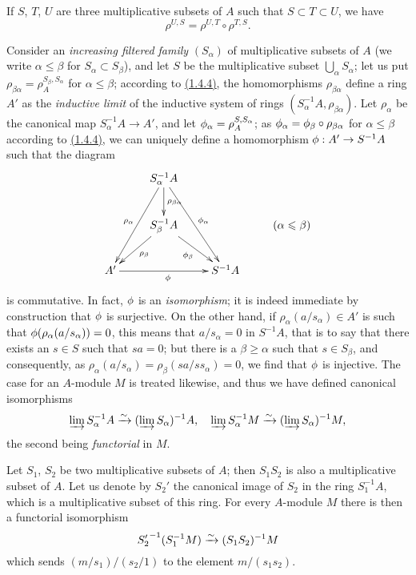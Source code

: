 \begin{env}[1.4.4]
\label{0.1.4.4}
If $S$, $T$, $U$ are three multiplicative subsets of $A$ such that
$S\subset T\subset U$, we have
\[
  \rho^{U,S}=\rho^{U,T}\circ\rho^{T,S}.
\]
\end{env}

\begin{env}[1.4.5]
\label{0.1.4.5}
Consider an {\em increasing filtered family} $(S_\alpha)$ of multiplicative
subsets of $A$ (we write $\alpha\leqslant\beta$ for $S_\alpha\subset S_\beta$),
and let $S$ be the multiplicative subset $\bigcup_\alpha S_\alpha$; let us put
$\rho_{\beta\alpha}=\rho_A^{S_\beta,S_\alpha}$ for $\alpha\leqslant\beta$;
according to \hyperref[0.1.4.4]{(1.4.4)}, the homomorphisms $\rho_{\beta\alpha}$ define a
ring $A'$ as the {\em inductive limit} of the inductive system of rings
$(S_\alpha^{-1}A,\rho_{\beta\alpha})$. Let $\rho_\alpha$ be the canonical map
$S_\alpha^{-1}A\to A'$, and let $\phi_\alpha=\rho_A^{S,S_\alpha}$; as
$\phi_\alpha=\phi_\beta\circ\rho_{\beta\alpha}$ for $\alpha\leqslant\beta$
according to \hyperref[0.1.4.4]{(1.4.4)}, we can uniquely define a homomorphism
$\phi:A'\to S^{-1}A$ such that the diagram
\[
  \xymatrix{
    & S_\alpha^{-1}A\ar[ddl]_{\rho_\alpha}
                    \ar[d]^{\rho_{\beta\alpha}}
                    \ar[rdd]^{\vphi_\alpha}\\
    & S_\beta^{-1}A\ar[ld]^{\rho_\beta}
                   \ar[rd]_{\vphi_\beta}
    & & (\alpha\leqslant\beta)\\
    A'\ar[rr]_\vphi
    & & S^{-1}A
  }
\]
is commutative. In fact, $\phi$ is an {\em isomorphism}; it is indeed
immediate by construction that $\phi$ is surjective. On the other hand, if
$\rho_\alpha(a/s_\alpha)\in A'$ is such that $\phi(\rho_\alpha(a/s_\alpha))=0$,
this means that $a/s_\alpha=0$ in $S^{-1}A$, that is to say that there exists an
$s\in S$ such that $sa=0$; but there is a $\beta\geqslant\alpha$ such that
$s\in S_\beta$, and consequently, as
$\rho_\alpha(a/s_\alpha)=\rho_\beta(sa/ss_\alpha)=0$, we find that $\phi$ is
injective. The case for an $A$-module $M$ is treated likewise, and thus we have
defined canonical isomorphisms
\[
  \varinjlim S_\alpha^{-1}A\xrightarrow{\sim}(\varinjlim S_\alpha)^{-1}A,\quad
  \varinjlim S_\alpha^{-1}M\xrightarrow{\sim}(\varinjlim S_\alpha)^{-1}M,
\]
the second being {\em functorial} in $M$.
\end{env}

\begin{env}[1.4.6]
\label{0.1.4.6}
Let $S_1$, $S_2$ be two multiplicative subsets of $A$; then $S_1 S_2$ is also a
multiplicative subset of $A$. Let us denote by $S_2'$ the canonical image of
$S_2$ in the ring $S_1^{-1}A$, which is a multiplicative subset of this ring.
For every $A$-module $M$ there is then a functorial isomorphism
\[
  {S_2'}^{-1}(S_1^{-1}M)\xrightarrow{\sim}(S_1 S_2)^{-1}M
\]
which sends $(m/s_1)/(s_2/1)$ to the element $m/(s_1 s_2)$.
\end{env}

